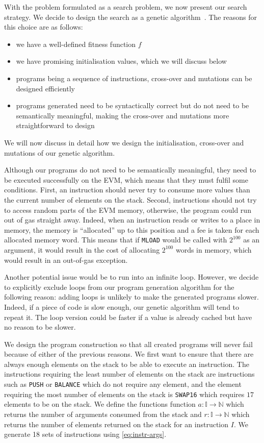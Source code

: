 With the problem formulated as a search problem, we now present our search strategy. We decide to design the search as a genetic algorithm~\cite{whitley1994genetic}. The reasons for this choice are as follows:

\begin{itemize}
  \item we have a well-defined fitness function $f$
  \item we have promising initialisation values, which we will discuss below
  \item programs being a sequence of instructions, cross-over and mutations can be designed efficiently
  \item programs generated need to be syntactically correct but do not need to be semantically meaningful, making the cross-over and mutations more straightforward to design
\end{itemize}
%
We will now discuss in detail how we design the initialisation, cross-over and mutations of our genetic algorithm.

Although our programs do not need to be semantically meaningful, they need to be executed successfully on the EVM, which means that they must fulfil some conditions. First, an instruction should never try to consume more values than the current number of elements on the stack. Second, instructions should not try to access random parts of the EVM memory, otherwise, the program could run out of gas straight away. Indeed, when an instruction reads or writes to a place in memory, the memory is ``allocated'' up to this position and a fee is taken for each allocated memory word. This means that if \lstinline{MLOAD} would be called with $2^{100}$ as an argument, it would result in the cost of allocating $2^{100}$ words in memory, which would result in an out-of-gas exception.

  Another potential issue would be to run into an infinite loop. However, we decide to explicitly exclude loops from our program generation algorithm for the following reason: adding loops is unlikely to make the generated programs slower. Indeed, if a piece of code is slow enough, our genetic algorithm will tend to repeat it. The loop version could be faster if a value is already cached but have no reason to be slower.

  We design the program construction so that all created programs will never fail because of either of the previous reasons. We first want to ensure that there are always enough elements on the stack to be able to execute an instruction. The instructions requiring the least number of elements on the stack are instructions such as \lstinline{PUSH} or \lstinline{BALANCE} which do not require any element, and the element requiring the most number of elements on the stack is \lstinline{SWAP16} which requires $17$ elements to be on the stack.
  We define the functions function $a : \mathbb{I} \rightarrow \mathbb{N}$ which returns the number of arguments consumed from the stack and $r : \mathbb{I} \rightarrow \mathbb{N}$ which returns the number of elements returned on the stack for an instruction $I$. We generate 18 sets of instructions using \autoref{eq:instr-args}.

